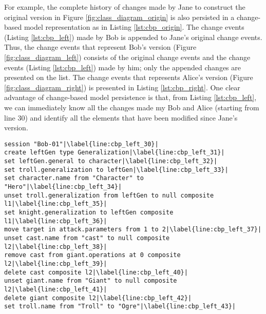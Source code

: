 For example, the complete history of changes made by Jane to construct the original version in Figure \ref{fig:class_diagram_origin} is also persisted in a change-based model representation as in Listing \ref{lst:cbp_origin}. The change events (Listing \ref{lst:cbp_left}) made by Bob is appended to Jane's original change events. Thus, the change events that represent Bob's version (Figure \ref{fig:class_diagram_left}) consists of the original change events and the change events (Listing \ref{lst:cbp_left}) made by him; only the appended changes are presented on the list. The change events that represents Alice's version (Figure \ref{fig:class_diagram_right}) is presented in Listing \ref{lst:cbp_right}. One clear advantage of change-based model persistence is that, from Listing \ref{lst:cbp_left}, we can immediately know all the changes made my Bob and Alice (starting from line 30) and identify all the elements that have been modified since Jane's version.  


\begin{lstlisting}[firstnumber=30,style=eol,escapechar=|,caption={The appended events made by Bob to produce the left version in Figure \ref{fig:class_diagram_left} (left version).},label=lst:cbp_left]
session "Bob-01"|\label{line:cbp_left_30}|
create leftGen type Generalization|\label{line:cbp_left_31}|
set leftGen.general to character|\label{line:cbp_left_32}|
set troll.generalization to leftGen|\label{line:cbp_left_33}|
set character.name from "Character" to "Hero"|\label{line:cbp_left_34}|
unset troll.generalization from leftGen to null composite l1|\label{line:cbp_left_35}|
set knight.generalization to leftGen composite l1|\label{line:cbp_left_36}|
move target in attack.parameters from 1 to 2|\label{line:cbp_left_37}|
unset cast.name from "cast" to null composite l2|\label{line:cbp_left_38}|
remove cast from giant.operations at 0 composite l2|\label{line:cbp_left_39}|
delete cast composite l2|\label{line:cbp_left_40}|
unset giant.name from "Giant" to null composite l2|\label{line:cbp_left_41}|
delete giant composite l2|\label{line:cbp_left_42}|
set troll.name from "Troll" to "Ogre"|\label{line:cbp_left_43}|
\end{lstlisting}

